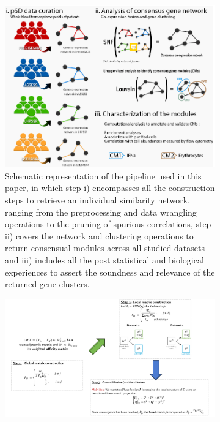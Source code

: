 \documentclass[mainlanguage=english,numlaboratories=2, nofrontcover=true,noaim=false, localbibs, colophon-location=verso-frontcover, oneside, 10pt, localtocs, version=final, nomakeabstract=true]{yathesis}
\begin{document}
{\begin{figure}
     \centering
     \begin{subfigure}[p]{0.6\textwidth}
         \centering
         \includegraphics[width=\textwidth]{figures/cheima_pipeline.png}
         \caption{Schematic representation of the pipeline used in this paper, in which step i) encompasses all the construction steps to retrieve an individual similarity network, ranging from the preprocessing and data wrangling operations to the pruning of spurious correlations, step ii) covers the network and clustering operations to return consensual modules across all studied datasets and iii) includes all the post statistical and biological experiences to assert the soundness and relevance of the returned gene clusters.}
         \label{subfig:cheima-pipeline}
     \end{subfigure}
     \vfill
     \begin{subfigure}[p]{0.4\textwidth}
         \centering
         \includegraphics[width=\textwidth]{figures/similarity_network_fusion.png}

\end{subfigure}
\end{figure}}
\end{document}
